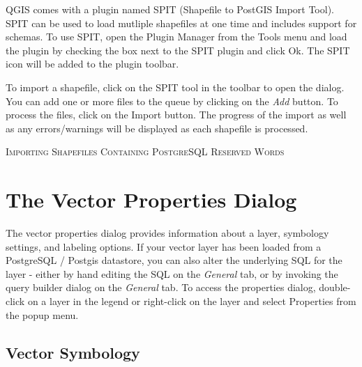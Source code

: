 QGIS comes with a
plugin named SPIT (Shapefile to PostGIS Import Tool).
SPIT can be used to load mutliple shapefiles at one time and includes support
for schemas. To use SPIT, open the Plugin Manager from the Tools menu and load
the plugin by checking the box next to the SPIT plugin and click Ok. The SPIT
icon will be added to the plugin toolbar. 

To import a shapefile, click on the SPIT tool in the toolbar to open the dialog.
You can add one or more files to the queue by clicking on the \textsl{Add}
button. To process the files, click on the Import button. The progress of the
import as well as any errors/warnings will be displayed as each shapefile is
processed.  
\begin{Tip}\caption{\textsc{Importing Shapefiles Containing
PostgreSQL Reserved Words}}
\end{Tip} 
\section{The Vector Properties
Dialog}\label{sec:vectorprops}
The vector properties dialog provides information about a layer, symbology
settings, and labeling options. If your vector layer has been loaded from a
PostgreSQL / Postgis datastore, you can also alter the underlying SQL for the
layer - either by hand editing the SQL on the \textit{General} tab, or by invoking the
query builder dialog on the \textit{General} tab. To access the properties dialog,
double-click on a layer in the legend or right-click on the layer and select
Properties from the popup menu.

\subsection{Vector Symbology}\label{sec:symbology}

